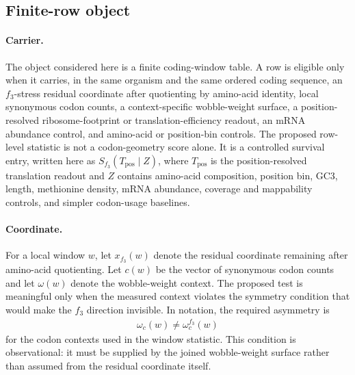 \subsection{Finite-row object}\label{sec:q6-f3-stress-position-resolved-translation-survival-object}

\paragraph{Carrier.} The object considered here is a finite coding-window table.  A row is eligible only when it carries, in the same organism and the same ordered coding sequence, an $f_3$-stress residual coordinate after quotienting by amino-acid identity, local synonymous codon counts, a context-specific wobble-weight surface, a position-resolved ribosome-footprint or translation-efficiency readout, an mRNA abundance control, and amino-acid or position-bin controls.  The proposed row-level statistic is not a codon-geometry score alone.  It is a controlled survival entry, written here as $S_{f_3}(T_{\mathrm{pos}}\mid Z)$, where $T_{\mathrm{pos}}$ is the position-resolved translation readout and $Z$ contains amino-acid composition, position bin, GC3, length, methionine density, mRNA abundance, coverage and mappability controls, and simpler codon-usage baselines.

\paragraph{Coordinate.} For a local window $w$, let $x_{f_3}(w)$ denote the residual coordinate remaining after amino-acid quotienting.  Let $c(w)$ be the vector of synonymous codon counts and let $\omega(w)$ denote the wobble-weight context.  The proposed test is meaningful only when the measured context violates the symmetry condition that would make the $f_3$ direction invisible.  In notation, the required asymmetry is
$$
\begin{aligned}
  \omega_c(w) \neq \omega^{f_3}_c(w)
\end{aligned}
$$
for the codon contexts used in the window statistic.  This condition is observational: it must be supplied by the joined wobble-weight surface rather than assumed from the residual coordinate itself.

